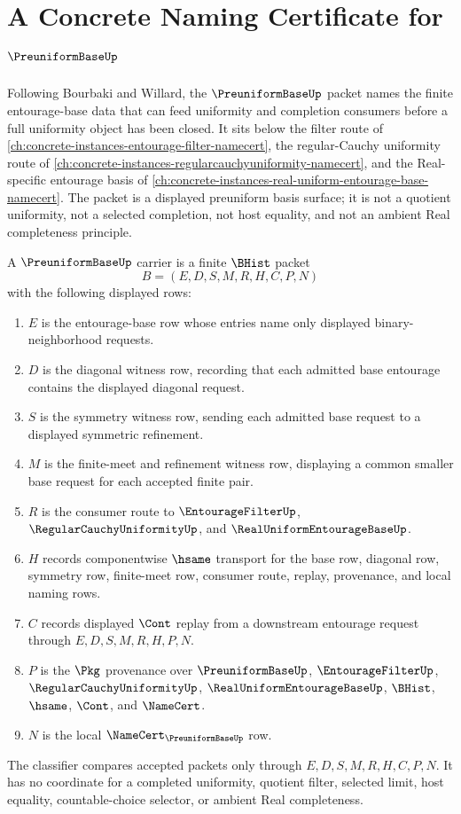 \chapter{A Concrete Naming Certificate for $\PreuniformBaseUp$}
\label{ch:concrete-instances-preuniform-base-namecert}

Following Bourbaki and Willard, the $\PreuniformBaseUp$ packet names the finite entourage-base data that can feed uniformity and completion consumers before a full uniformity object has been closed. It sits below the filter route of \autoref{ch:concrete-instances-entourage-filter-namecert}, the regular-Cauchy uniformity route of \autoref{ch:concrete-instances-regularcauchyuniformity-namecert}, and the Real-specific entourage basis of \autoref{ch:concrete-instances-real-uniform-entourage-base-namecert}. The packet is a displayed preuniform basis surface; it is not a quotient uniformity, not a selected completion, not host equality, and not an ambient Real completeness principle.

\begin{definition}
\label{def:preuniform-base-carrier}
A $\PreuniformBaseUp$ carrier is a finite $\BHist$ packet
$$
B=(E,D,S,M,R,H,C,P,N)
$$
with the following displayed rows:
\begin{enumerate}
\item $E$ is the entourage-base row whose entries name only displayed binary-neighborhood requests.
\item $D$ is the diagonal witness row, recording that each admitted base entourage contains the displayed diagonal request.
\item $S$ is the symmetry witness row, sending each admitted base request to a displayed symmetric refinement.
\item $M$ is the finite-meet and refinement witness row, displaying a common smaller base request for each accepted finite pair.
\item $R$ is the consumer route to $\EntourageFilterUp$, $\RegularCauchyUniformityUp$, and $\RealUniformEntourageBaseUp$.
\item $H$ records componentwise $\hsame$ transport for the base row, diagonal row, symmetry row, finite-meet row, consumer route, replay, provenance, and local naming rows.
\item $C$ records displayed $\Cont$ replay from a downstream entourage request through $E,D,S,M,R,H,P,N$.
\item $P$ is the $\Pkg$ provenance over $\PreuniformBaseUp$, $\EntourageFilterUp$, $\RegularCauchyUniformityUp$, $\RealUniformEntourageBaseUp$, $\BHist$, $\hsame$, $\Cont$, and $\NameCert$.
\item $N$ is the local $\NameCert_{\PreuniformBaseUp}$ row.
\end{enumerate}
The classifier compares accepted packets only through $E,D,S,M,R,H,C,P,N$. It has no coordinate for a completed uniformity, quotient filter, selected limit, host equality, countable-choice selector, or ambient Real completeness.
\end{definition}

